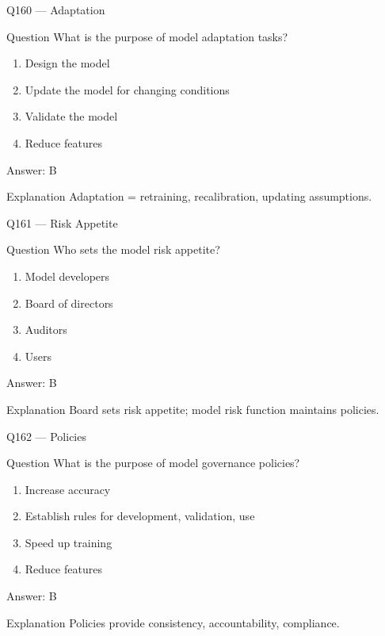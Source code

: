 \documentclass[aspectratio=169,8pt]{beamer}
\begin{document}
	\begin{frame}{Q160 --- Adaptation}
		\begin{block}{Question}
			What is the purpose of model adaptation tasks?
		\end{block}
		\begin{enumerate}
			\item Design the model
			\item Update the model for changing conditions
			\item Validate the model
			\item Reduce features
		\end{enumerate}
		\begin{exampleblock}{Answer: B}\end{exampleblock}
		\begin{block}{Explanation}
			Adaptation = retraining, recalibration, updating assumptions.
		\end{block}
	\end{frame}
	
	\begin{frame}{Q161 --- Risk Appetite}
		\begin{block}{Question}
			Who sets the model risk appetite?
		\end{block}
		\begin{enumerate}
			\item Model developers
			\item Board of directors
			\item Auditors
			\item Users
		\end{enumerate}
		\begin{exampleblock}{Answer: B}\end{exampleblock}
		\begin{block}{Explanation}
			Board sets risk appetite; model risk function maintains policies.
		\end{block}
	\end{frame}
	
	\begin{frame}{Q162 --- Policies}
		\begin{block}{Question}
			What is the purpose of model governance policies?
		\end{block}
		\begin{enumerate}
			\item Increase accuracy
			\item Establish rules for development, validation, use
			\item Speed up training
			\item Reduce features
		\end{enumerate}
		\begin{exampleblock}{Answer: B}\end{exampleblock}
		\begin{block}{Explanation}
			Policies provide consistency, accountability, compliance.
		\end{block}
	\end{frame}
	
\end{document}

